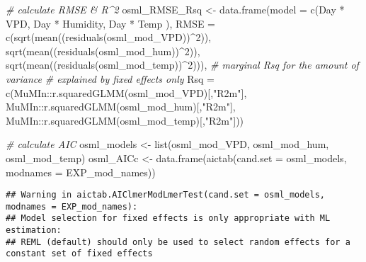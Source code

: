 \documentclass[
]{article}
\newenvironment{Shaded}{\begin{snugshade}}{\end{snugshade}}
\newcommand{\AttributeTok}[1]{\textcolor[rgb]{0.77,0.63,0.00}{#1}}
\newcommand{\CommentTok}[1]{\textcolor[rgb]{0.56,0.35,0.01}{\textit{#1}}}
\newcommand{\DecValTok}[1]{\textcolor[rgb]{0.00,0.00,0.81}{#1}}
\newcommand{\FunctionTok}[1]{\textcolor[rgb]{0.00,0.00,0.00}{#1}}
\newcommand{\NormalTok}[1]{#1}
\newcommand{\OtherTok}[1]{\textcolor[rgb]{0.56,0.35,0.01}{#1}}
\newcommand{\SpecialCharTok}[1]{\textcolor[rgb]{0.00,0.00,0.00}{#1}}
\newcommand{\StringTok}[1]{\textcolor[rgb]{0.31,0.60,0.02}{#1}}
\begin{document}
\begin{Shaded}
\begin{Highlighting}[]
\CommentTok{\# calculate RMSE \& R\^{}2}
\NormalTok{osml\_RMSE\_Rsq }\OtherTok{\textless{}{-}} \FunctionTok{data.frame}\NormalTok{(}\AttributeTok{model =} 
                               \FunctionTok{c}\NormalTok{(}\StringTok{\textquotesingle{}Day * VPD\textquotesingle{}}\NormalTok{,}
                                 \StringTok{\textquotesingle{}Day * Humidity\textquotesingle{}}\NormalTok{,}
                                 \StringTok{\textquotesingle{}Day * Temp\textquotesingle{}}
\NormalTok{                                 ),}
                           \AttributeTok{RMSE =} \FunctionTok{c}\NormalTok{(}\FunctionTok{sqrt}\NormalTok{(}\FunctionTok{mean}\NormalTok{((}\FunctionTok{residuals}\NormalTok{(osml\_mod\_VPD))}\SpecialCharTok{\^{}}\DecValTok{2}\NormalTok{)),}
                                    \FunctionTok{sqrt}\NormalTok{(}\FunctionTok{mean}\NormalTok{((}\FunctionTok{residuals}\NormalTok{(osml\_mod\_hum))}\SpecialCharTok{\^{}}\DecValTok{2}\NormalTok{)),}
                                    \FunctionTok{sqrt}\NormalTok{(}\FunctionTok{mean}\NormalTok{((}\FunctionTok{residuals}\NormalTok{(osml\_mod\_temp))}\SpecialCharTok{\^{}}\DecValTok{2}\NormalTok{))),}
                           \CommentTok{\# marginal Rsq for the amount of variance}
                           \CommentTok{\# explained by fixed effects only}
                           \AttributeTok{Rsq =} \FunctionTok{c}\NormalTok{(MuMIn}\SpecialCharTok{::}\FunctionTok{r.squaredGLMM}\NormalTok{(osml\_mod\_VPD)[,}\StringTok{"R2m"}\NormalTok{],}
\NormalTok{                                   MuMIn}\SpecialCharTok{::}\FunctionTok{r.squaredGLMM}\NormalTok{(osml\_mod\_hum)[,}\StringTok{"R2m"}\NormalTok{],}
\NormalTok{                                   MuMIn}\SpecialCharTok{::}\FunctionTok{r.squaredGLMM}\NormalTok{(osml\_mod\_temp)[,}\StringTok{"R2m"}\NormalTok{]))}

\CommentTok{\# calculate AIC}
\NormalTok{osml\_models }\OtherTok{\textless{}{-}} \FunctionTok{list}\NormalTok{(osml\_mod\_VPD, osml\_mod\_hum, osml\_mod\_temp)}
\NormalTok{osml\_AICc }\OtherTok{\textless{}{-}} \FunctionTok{data.frame}\NormalTok{(}\FunctionTok{aictab}\NormalTok{(}\AttributeTok{cand.set =}\NormalTok{ osml\_models, }
                                 \AttributeTok{modnames =}\NormalTok{ EXP\_mod\_names))}
\end{Highlighting}
\end{Shaded}

\begin{verbatim}
## Warning in aictab.AIClmerModLmerTest(cand.set = osml_models, modnames = EXP_mod_names): 
## Model selection for fixed effects is only appropriate with ML estimation:
## REML (default) should only be used to select random effects for a constant set of fixed effects
\end{verbatim}
\end{document}
